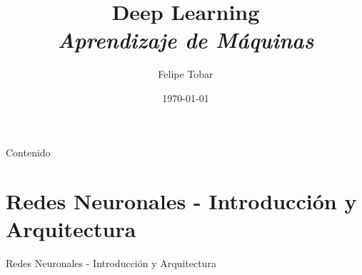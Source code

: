 \documentclass[9pt]{beamer}
\title[Aprendizaje de Máquinas]{ Deep Learning\\
\textit{Aprendizaje de Máquinas}}
\author[]{Felipe Tobar}
\institute{CMM - Universidad de Chile}
\date{\today}
\begin{document}
\begin{frame}
  \titlepage
\end{frame}
\begin{frame}{Contenido}
  \tableofcontents
  
\end{frame}


\section{Redes Neuronales - Introducción y Arquitectura}
\begin{frame}{Redes Neuronales - Introducción y Arquitectura}

\end{frame}


\end{document}
